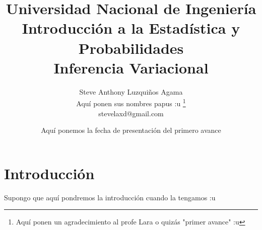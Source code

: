\documentclass[twocolumn]{article}
\begin{document}
 

\title{Universidad Nacional de Ingeniería\\
Introducción a la Estadística y Probabilidades\\
Inferencia Variacional}
\author{
Steve Anthony Luzquiños Agama\\
Aquí ponen sus nombres papus :u
\thanks{Aquí ponen un agradecimiento al profe Lara o quizás "primer avance" :u}
\\stevelaxd@gmail.com
}
\date{Aquí ponemos la fecha de presentación del primero avance}

\maketitle


\section{Introducción}
Supongo que aquí pondremos la introducción cuando la tengamos :u
\end{document}

